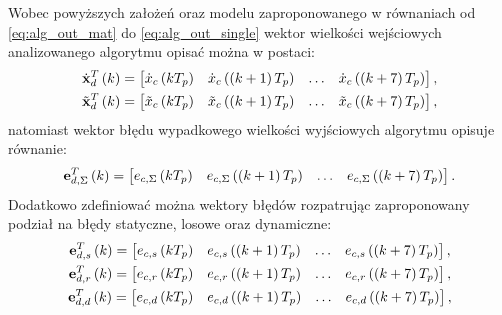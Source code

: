 Wobec powyższych założeń oraz modelu zaproponowanego w równaniach od \eqref{eq:alg_out_mat} do \eqref{eq:alg_out_single} wektor wielkości wejściowych analizowanego algorytmu opisać można w postaci:
\begin{gather}
\dot{\mathbf{x}}_{d}^{T} \left(k\right) =
\begin{bmatrix}
\dot{x}_{c} \left(kT_{p}\right) & \dot{x}_{c} \left( \left(k+1\right) T_{p} \right) & \hdots & \dot{x}_{c} \left( \left(k+7\right) T_{p} \right)
\end{bmatrix}
\label{eq:sym_partd_input_ideal}, \\
\tilde{\mathbf{x}}_{d}^{T} \left(k\right) =
\begin{bmatrix}
\tilde{x}_{c} \left(kT_{p}\right) & \tilde{x}_{c} \left( \left(k+1\right) T_{p} \right) & \hdots & \tilde{x}_{c} \left( \left(k+7\right) T_{p} \right)
\end{bmatrix}
\label{eq:sym_partd_input_real},
\end{gather}
natomiast wektor błędu wypadkowego wielkości wyjściowych algorytmu opisuje równanie:
\begin{equation}
\mathbf{e}_{d,\Sigma}^{T} \left(k\right) =
\begin{bmatrix}
e_{c,\Sigma} \left(kT_{p}\right) & e_{c,\Sigma} \left( \left(k+1\right) T_{p} \right) & \hdots & e_{c,\Sigma} \left( \left(k+7\right) T_{p} \right)
\end{bmatrix}
\label{eq:sym_partd_input_error_sum}.
\end{equation}
Dodatkowo zdefiniować można wektory błędów rozpatrując zaproponowany podział na błędy statyczne, losowe oraz dynamiczne:
\begin{gather}
\mathbf{e}_{d,s}^{T} \left(k\right) =
\begin{bmatrix}
e_{c,s} \left(kT_{p}\right) & e_{c,s} \left( \left(k+1\right) T_{p} \right) & \hdots & e_{c,s} \left( \left(k+7\right) T_{p} \right)
\end{bmatrix}
\label{eq:sym_partd_input_error_stat}, \\
\mathbf{e}_{d,r}^{T} \left(k\right) =
\begin{bmatrix}
e_{c,r} \left(kT_{p}\right) & e_{c,r} \left( \left(k+1\right) T_{p} \right) & \hdots & e_{c,r} \left( \left(k+7\right) T_{p} \right)
\end{bmatrix}
\label{eq:sym_partd_input_error_rand}, \\
\mathbf{e}_{d,d}^{T} \left(k\right) =
\begin{bmatrix}
e_{c,d} \left(kT_{p}\right) & e_{c,d} \left( \left(k+1\right) T_{p} \right) & \hdots & e_{c,d} \left( \left(k+7\right) T_{p} \right)
\end{bmatrix}
\label{eq:sym_partd_input_error_dyn},
\end{gather}
